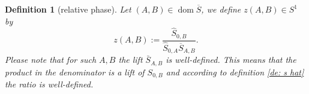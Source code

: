 \documentclass[b5paper,draft,openbib,12pt]{memoir}
\newtheorem{Def}{Definition}
\DeclareMathOperator{\dom}{dom}
\begin{document}








\begin{Def}[relative phase]\label{def relative phase}
Let \((A,B) \in\dom\overline{S}\), we define \(z(A,B)\in S^1\) by
\begin{equation}\label{def z}
z(A,B):=\frac{\hat{S}_{0,B}}{\hat{S}_{0,A}\overline{S}_{A,B}}.
\end{equation}
Please note that for such \(A,B\) the lift \(\bar{S}_{A,B}\) 
is well-defined. This means that the product in the 
denominator is a lift of \(S_{0,B}\)
and according to definition \ref{de: s hat} the 
ratio is well-defined. 
\end{Def}
\end{document}
